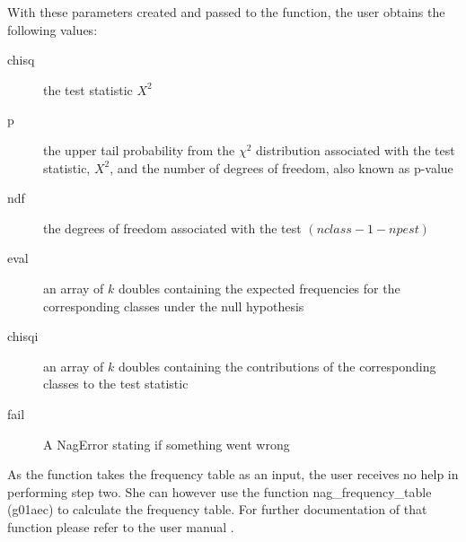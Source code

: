 \documentclass{article}
\begin{document}
With these parameters created and passed to the function, the user obtains the following values:
\begin{description}
	\item[chisq] the test statistic $X^2$
	\item[p] the upper tail probability from the $\chi^2$ distribution associated with the test statistic, $X^2$, and the number of degrees of freedom, also known as p-value
	\item[ndf] the degrees of freedom associated with the test $(nclass-1-npest)$
	\item[eval] an array of $k$ doubles containing the expected frequencies for the corresponding classes under the null hypothesis
	\item[chisqi] an array of $k$ doubles containing the contributions of the corresponding classes to the test statistic
	\item[fail] A NagError stating if something went wrong
\end{description}
As the function takes the frequency table as an input, the user receives no help in performing step two.
She can however use the function nag\_frequency\_table (g01aec) to calculate the frequency table.
For further documentation of that function please refer to the user manual \cite{nagc}.
\end{document}
